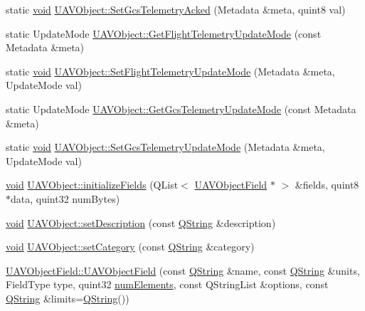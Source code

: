 \begin{DoxyCompactItemize}
static \hyperlink{group___u_a_v_objects_plugin_ga444cf2ff3f0ecbe028adce838d373f5c}{void} \hyperlink{group___u_a_v_objects_plugin_ga190e264f603dd8ade6b6f9e84debfb4c}{\-U\-A\-V\-Object\-::\-Set\-Gcs\-Telemetry\-Acked} (\-Metadata \&meta, quint8 val)
\item 
static \-Update\-Mode \hyperlink{group___u_a_v_objects_plugin_ga6cd43aaa339c4bd8beead8988bb9f1a6}{\-U\-A\-V\-Object\-::\-Get\-Flight\-Telemetry\-Update\-Mode} (const \-Metadata \&meta)
\item 
static \hyperlink{group___u_a_v_objects_plugin_ga444cf2ff3f0ecbe028adce838d373f5c}{void} \hyperlink{group___u_a_v_objects_plugin_gaa9fa161b9a5607e4ee1086b72f1b70e5}{\-U\-A\-V\-Object\-::\-Set\-Flight\-Telemetry\-Update\-Mode} (\-Metadata \&meta, \-Update\-Mode val)
\item 
static \-Update\-Mode \hyperlink{group___u_a_v_objects_plugin_ga81651b86ef2cf0b05483152c6728b742}{\-U\-A\-V\-Object\-::\-Get\-Gcs\-Telemetry\-Update\-Mode} (const \-Metadata \&meta)
\item 
static \hyperlink{group___u_a_v_objects_plugin_ga444cf2ff3f0ecbe028adce838d373f5c}{void} \hyperlink{group___u_a_v_objects_plugin_ga8fdb0f35b52c8dea0a512fd411d2346e}{\-U\-A\-V\-Object\-::\-Set\-Gcs\-Telemetry\-Update\-Mode} (\-Metadata \&meta, \-Update\-Mode val)
\item 
\hyperlink{group___u_a_v_objects_plugin_ga444cf2ff3f0ecbe028adce838d373f5c}{void} \hyperlink{group___u_a_v_objects_plugin_ga7aa3a71a68a9190731f720ad0eb1c772}{\-U\-A\-V\-Object\-::initialize\-Fields} (\-Q\-List$<$ \hyperlink{class_u_a_v_object_field}{\-U\-A\-V\-Object\-Field} $\ast$ $>$ \&fields, quint8 $\ast$data, quint32 num\-Bytes)
\item 
\hyperlink{group___u_a_v_objects_plugin_ga444cf2ff3f0ecbe028adce838d373f5c}{void} \hyperlink{group___u_a_v_objects_plugin_ga9310ee9c9869110219a7fcd311aaaf28}{\-U\-A\-V\-Object\-::set\-Description} (const \hyperlink{group___u_a_v_objects_plugin_gab9d252f49c333c94a72f97ce3105a32d}{\-Q\-String} \&description)
\item 
\hyperlink{group___u_a_v_objects_plugin_ga444cf2ff3f0ecbe028adce838d373f5c}{void} \hyperlink{group___u_a_v_objects_plugin_gac1d47f2428a0939dbe9544b6c6add6b5}{\-U\-A\-V\-Object\-::set\-Category} (const \hyperlink{group___u_a_v_objects_plugin_gab9d252f49c333c94a72f97ce3105a32d}{\-Q\-String} \&category)
\item 
\hyperlink{group___u_a_v_objects_plugin_ga6ebca8c11d33d2984ef111420988e11d}{\-U\-A\-V\-Object\-Field\-::\-U\-A\-V\-Object\-Field} (const \hyperlink{group___u_a_v_objects_plugin_gab9d252f49c333c94a72f97ce3105a32d}{\-Q\-String} \&name, const \hyperlink{group___u_a_v_objects_plugin_gab9d252f49c333c94a72f97ce3105a32d}{\-Q\-String} \&units, \-Field\-Type type, quint32 \hyperlink{uavobjecttemplate_8m_a5091f26d230c839edecd7245ab426bd6}{num\-Elements}, const \-Q\-String\-List \&options, const \hyperlink{group___u_a_v_objects_plugin_gab9d252f49c333c94a72f97ce3105a32d}{\-Q\-String} \&limits=\hyperlink{group___u_a_v_objects_plugin_gab9d252f49c333c94a72f97ce3105a32d}{\-Q\-String}())

\end{DoxyCompactItemize}
